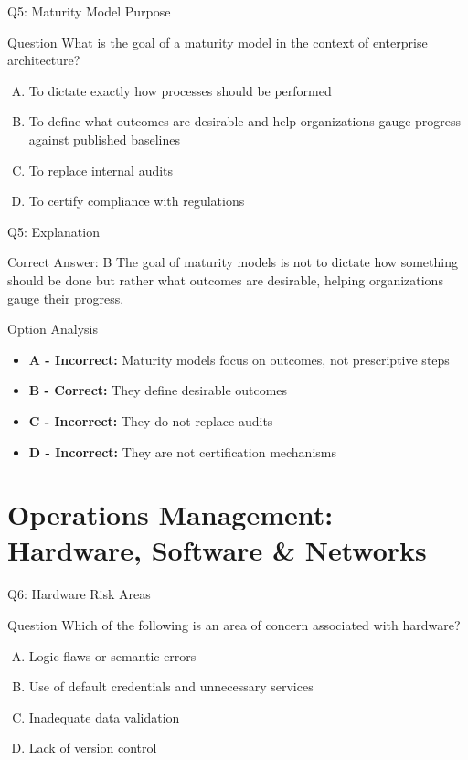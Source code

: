 \documentclass{beamer}
\begin{document}
	\begin{frame}{Q5: Maturity Model Purpose}
		\begin{block}{Question}
			What is the goal of a maturity model in the context of enterprise architecture?
		\end{block}
		\begin{enumerate}[(A)]
			\item To dictate exactly how processes should be performed
			\item To define what outcomes are desirable and help organizations gauge progress against published baselines
			\item To replace internal audits
			\item To certify compliance with regulations
		\end{enumerate}
	\end{frame}
	
	\begin{frame}{Q5: Explanation}
		\begin{block}{Correct Answer: B}
			The goal of maturity models is not to dictate how something should be done but rather what outcomes are desirable, helping organizations gauge their progress.
		\end{block}
		\begin{block}{Option Analysis}
			\begin{itemize}
				\item \textbf{A - Incorrect:} Maturity models focus on outcomes, not prescriptive steps
				\item \textbf{B - Correct:} They define desirable outcomes
				\item \textbf{C - Incorrect:} They do not replace audits
				\item \textbf{D - Incorrect:} They are not certification mechanisms
			\end{itemize}
		\end{block}
	\end{frame}
	
	
	\section{Operations Management: Hardware, Software \& Networks}
	
	\begin{frame}{Q6: Hardware Risk Areas}
		\begin{block}{Question}
			Which of the following is an area of concern associated with hardware?
		\end{block}
		\begin{enumerate}[(A)]
			\item Logic flaws or semantic errors
			\item Use of default credentials and unnecessary services
			\item Inadequate data validation
			\item Lack of version control
		\end{enumerate}
	\end{frame}
	
\end{document}
